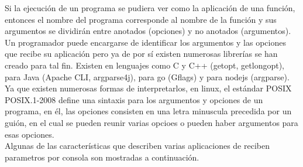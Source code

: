 Si la ejecución de un programa se pudiera ver como la aplicación de una función, entonces el nombre del programa corresponde al nombre de la función y sus argumentos se dividirán entre anotados (opciones) y no anotados (argumentos).\\

Un programador puede encargarse de identificar los argumentos y las opciones que recibe su aplicación pero ya de por sí existen numerosas librerías se han creado para tal fin. Existen en lenguajes como C y C++ (getopt, getlongopt), para Java (Apache CLI, argparse4j), para go (Gflags) y para nodejs (argparse).\\

Ya que existen numerosas formas de interpretarlos, en linux, el estándar POSIX POSIX.1-2008 define una sintaxis para los argumentos y opciones de un programa, en él, las opciones consisten en una letra minuscula precedida por un guión, en el cual se pueden reunir varias opcioes o pueden haber argumentos para esas opciones. \\

Algunas de las características que describen varias aplicaciones de reciben parametros por consola son mostradas a continuación.\\

